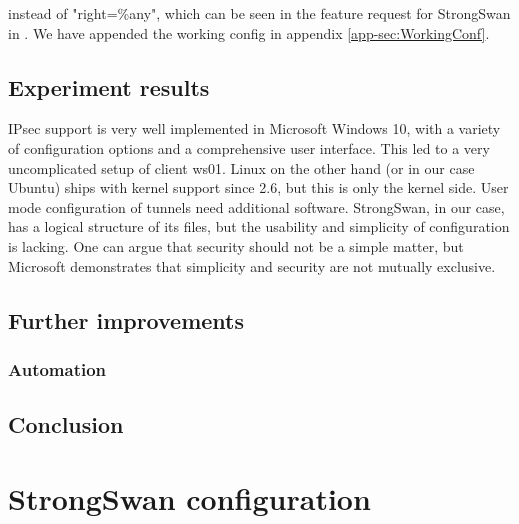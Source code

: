 \documentclass[a4paper]{report}
\begin{document}
instead of "right=\%any", which can be seen in the feature request for StrongSwan in \cite{Brunner2012}. We have appended the working config in appendix \ref{app-sec:WorkingConf}.

\section{Experiment results}
\label{sec:ExpRes}
IPsec support is very well implemented in Microsoft Windows 10, with a variety of configuration options and a comprehensive user interface. This led to a very uncomplicated setup of client ws01. Linux on the other hand (or in our case Ubuntu) ships with kernel support since 2.6, but this is only the kernel side. User mode configuration of tunnels need additional software. StrongSwan, in our case, has a logical structure of its files, but the usability and simplicity of configuration is lacking. One can argue that security should not be a simple matter, but Microsoft demonstrates that simplicity and security are not mutually exclusive. 

\section{Further improvements}
\subsection{Automation}

\section{Conclusion}
\label{sec:Conc}

\appendix

\chapter{StrongSwan configuration}
\label{app-ch:StrongSwan}
\end{document}
